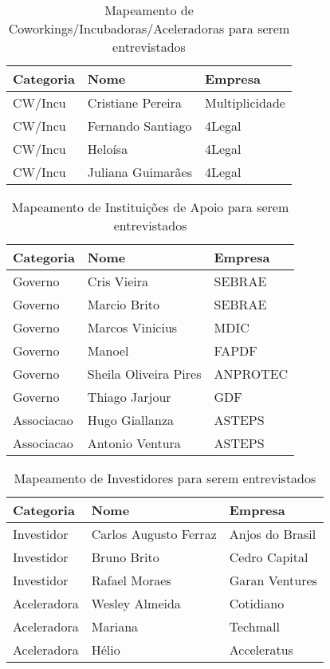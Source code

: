 \begin{table}[!htb]
	\centering
	\label{tabela:sugestao_de_coworkings_para_entrevista}
	\begin{tabular}{ | p{3cm} | p{8cm} | p{4cm} | }
		\hline
		Categoria & Nome & Empresa \\ \hline
		CW/Incu & Cristiane Pereira & Multiplicidade \\ \hline
		CW/Incu & Fernando Santiago & 4Legal \\ \hline
		CW/Incu & Heloísa & 4Legal \\ \hline
		CW/Incu & Juliana Guimarães & 4Legal \\ \hline
	\end{tabular}
	\caption{Mapeamento de Coworkings/Incubadoras/Aceleradoras para serem entrevistados}
\end{table}

\begin{table}[!htb]
	\centering
	\label{tabela:sugestao_de_instituicoes_para_entrevista}
	\begin{tabular}{ | p{3cm} | p{8cm} | p{4cm} | }
		\hline
		Categoria & Nome & Empresa \\ \hline
		Governo & Cris Vieira & SEBRAE \\ \hline
		Governo & Marcio Brito & SEBRAE \\ \hline
		Governo & Marcos Vinicius & MDIC \\ \hline
		Governo & Manoel & FAPDF \\ \hline
		Governo & Sheila Oliveira Pires & ANPROTEC \\ \hline
		Governo & Thiago Jarjour & GDF \\ \hline
		Associacao & Hugo Giallanza & ASTEPS \\ \hline
		Associacao & Antonio Ventura & ASTEPS \\ \hline

	\end{tabular}
	\caption{Mapeamento de Instituições de Apoio para serem entrevistados}
\end{table}

\begin{table}[!htb]
	\centering
	\label{tabela:sugestao_de_investidores_para_entrevista}
	\begin{tabular}{ | p{3cm} | p{8cm} | p{4cm} | }
		\hline
		Categoria & Nome & Empresa \\ \hline
		Investidor & Carlos Augusto Ferraz & Anjos do Brasil \\ \hline
		Investidor & Bruno Brito & Cedro Capital \\ \hline
		Investidor & Rafael Moraes & Garan Ventures \\ \hline
		Aceleradora & Wesley Almeida & Cotidiano \\ \hline
		Aceleradora & Mariana & Techmall \\ \hline
		Aceleradora & Hélio & Acceleratus \\ \hline	
	\end{tabular}
	\caption{Mapeamento de Investidores para serem entrevistados}
\end{table}

